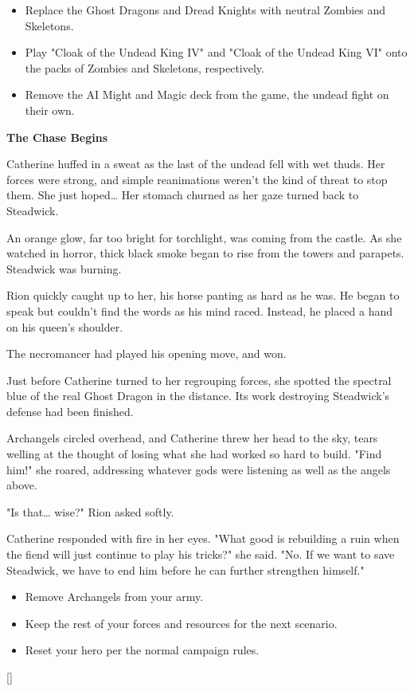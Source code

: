 \begin{multicols*}{2}
\begin{itemize}
  \item \textcolor{darkcandyapplered}{Replace the Ghost Dragons and Dread Knights with  neutral Zombies and Skeletons.}
  \item \textcolor{darkcandyapplered}{Play "Cloak of the Undead King IV" and "Cloak of the Undead King VI" onto the packs of Zombies and Skeletons, respectively.}
  \item \textcolor{darkcandyapplered}{Remove the AI Might and Magic deck from the game, the undead fight on their own.}
\end{itemize}


\textbf{The Chase Begins}

Catherine huffed in a sweat as the last of the undead fell with wet thuds. Her forces were strong, and simple reanimations weren't the kind of threat to stop them. She just hoped… Her stomach churned as her gaze turned back to Steadwick.

An orange glow, far too bright for torchlight, was coming from the castle. As she watched in horror, thick black smoke began to rise from the towers and parapets. Steadwick was burning.

Rion quickly caught up to her, his horse panting as hard as he was. He began to speak but couldn't find the words as his mind raced. Instead, he placed a hand on his queen's shoulder. 

The necromancer had played his opening move, and won.

Just before Catherine turned to her regrouping forces, she spotted the spectral blue of the real Ghost Dragon in the distance. Its work destroying Steadwick's defense had been finished.

Archangels circled overhead, and Catherine threw her head to the sky, tears welling at the thought of losing what she had worked so hard to build. "Find him!" she roared, addressing whatever gods were listening as well as the angels above.

"Is that… wise?" Rion asked softly.

Catherine responded with fire in her eyes. "What good is rebuilding a ruin when the fiend will just continue to play his tricks?" she said. "No. If we want to save Steadwick, we have to end him before he can further strengthen himself."

\begin{itemize}
  \item \textcolor{darkcandyapplered}{Remove Archangels from your army.}
  \item \textcolor{darkcandyapplered}{Keep the rest of your forces and resources for the next scenario.}
  \item \textcolor{darkcandyapplered}{Reset your hero per the normal campaign rules.}
\end{itemize}

\columnbreak

\begin{center}
\raisebox{0pt}[\dimexpr{}\baselineskip\relax]{}
\end{center}

\end{multicols*}






